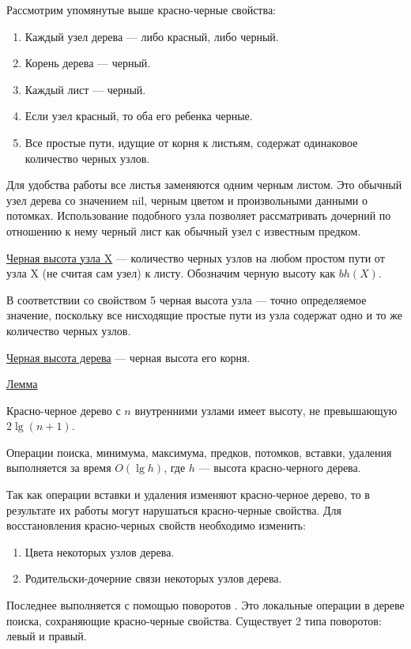 		Рассмотрим упомянутые выше красно-черные свойства:
		\begin{enumerate}
			\item Каждый узел дерева --- либо красный, либо черный.
			\item Корень дерева --- черный.
			\item Каждый лист --- черный.
			\item Если узел красный, то оба его ребенка черные.
			\item Все простые пути, идущие от корня к листьям, содержат 
				  одинаковое количество черных узлов.
		\end{enumerate}
		
		Для удобства работы все листья заменяются одним черным листом.
		Это обычный узел дерева со значением nil, черным цветом и произвольными данными
		о потомках. Использование подобного узла позволяет рассматривать дочерний 
		по отношению к нему черный лист как обычный узел с известным предком.
		
		\underline{Черная высота узла X} --- количество черных узлов на любом простом 
		пути от узла X (не считая сам узел) к листу. Обозначим черную высоту
		как $bh(X)$.

		В соответствии со свойством 5 черная высота узла --- точно определяемое значение,
		поскольку все нисходящие простые пути из узла содержат одно и то же 
		количество черных узлов.

		\underline{Черная высота дерева} --- черная высота его корня.

		\underline{Лемма}

		Красно-черное дерево с $n$ внутренними узлами имеет высоту, не превышающую 
		$2\lg(n+1)$.
	
		Операции поиска, минимума, максимума, предков, потомков, вставки, удаления выполняется 
		за время $O(\lg h)$, где $h$ --- высота красно-черного дерева.

		Так как операции вставки и удаления изменяют красно-черное дерево,
		то в результате их работы могут нарушаться красно-черные свойства. 
		Для восстановления красно-черных свойств необходимо изменить:
		\begin{enumerate}
			\item Цвета некоторых узлов дерева.
			\item Родительски-дочерние связи некоторых узлов дерева.
		\end{enumerate}
		
		Последнее выполняется с помощью поворотов \cite{RBdelete}. Это локальные операции в
		дереве поиска, сохраняющие красно-черные свойства.
		Существует 2 типа поворотов: левый и правый.
		
